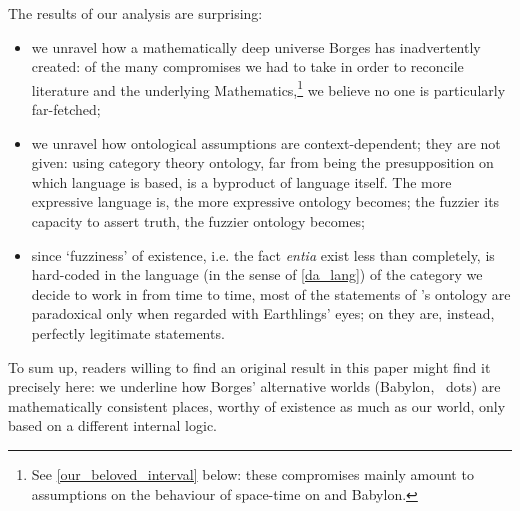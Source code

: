 The results of our analysis are surprising:
\begin{itemize}
  \item we unravel how a mathematically deep universe Borges has inadvertently created: of the many compromises we had to take in order to reconcile literature and the underlying Mathematics,\footnote{See \autoref{our_beloved_interval} below: these compromises mainly amount to assumptions on the behaviour of space-time on \tlon and Babylon.} we believe no one is particularly far-fetched;
  \item we unravel how ontological assumptions are context-dependent; they are not given: using category theory ontology, far from being the presupposition on which language is based, is a byproduct of language itself. The more expressive language is, the more expressive ontology becomes; the fuzzier its capacity to assert truth, the fuzzier ontology becomes;
  \item since `fuzziness' of existence, i.e. the fact \emph{entia} exist less than completely, is hard-coded in the language (in the sense of \autoref{da_lang}) of the category we decide to work in from time to time, most of the statements of \tlon's ontology are paradoxical only when regarded with Earthlings' eyes; on \tlon they are, instead, perfectly legitimate statements.
\end{itemize}
To sum up, readers willing to find an original result in this paper might find it precisely here: we underline how Borges' alternative worlds (Babylon, \tlon \ dots) are mathematically consistent places, worthy of existence as much as our world, only based on a different internal logic. 

